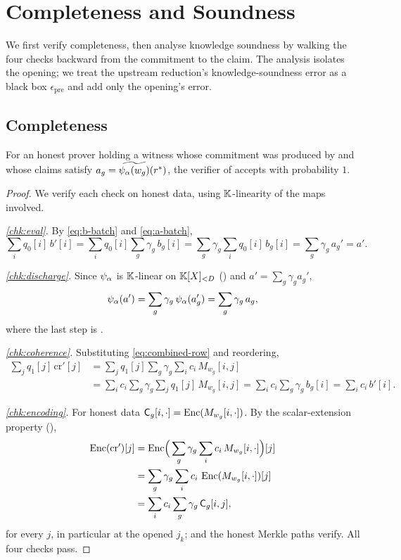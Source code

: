 \section{Completeness and Soundness}
\label{sec:soundness}

We first verify completeness, then analyse knowledge soundness by
walking the four checks backward from the commitment to the claim. The
analysis isolates the opening; we treat the upstream reduction's
knowledge-soundness error as a black box $\epsilon_{\mathrm{pre}}$ and
add only the opening's error.

\subsection{Completeness}

\begin{theorem}[Completeness]
\label{thm:completeness}
For an honest prover holding a witness whose commitment was produced by
 and whose claims satisfy
$a_g = \widetilde{\psi_{\alpha}(w_g)}(r^*)$, the verifier of  accepts
with probability $1$.
\end{theorem}

\begin{proof}
We verify each check on honest data, using $\mathbb{K}$-linearity of the maps
involved.

\emph{\ref{chk:eval}.} By \eqref{eq:b-batch} and \eqref{eq:a-batch},
\[
  \sum_i q_0[i]\,b'[i]
  = \sum_i q_0[i]\sum_g \gamma_g\,b_g[i]
  = \sum_g \gamma_g \sum_i q_0[i]\,b_g[i]
  = \sum_g \gamma_g\,a_g' = a'.
\]

\emph{\ref{chk:discharge}.} Since $\psi_{\alpha}$ is $\mathbb{K}$-linear on $\mathbb{K}[X]_{<D}$
() and $a' = \sum_g \gamma_g a_g'$,
\[
  \psi_{\alpha}(a') = \sum_g \gamma_g\,\psi_{\alpha}(a_g') = \sum_g \gamma_g\,a_g,
\]
where the last step is .

\emph{\ref{chk:coherence}.} Substituting \eqref{eq:combined-row} and reordering,
\[
\begin{aligned}
  \sum_j q_1[j]\,\mathrm{cr}'[j]
  &= \sum_j q_1[j]\sum_g \gamma_g \sum_i c_i\,M_{w_g}[i,j] \\
  &= \sum_i c_i \sum_g \gamma_g \sum_j q_1[j]\,M_{w_g}[i,j]
   = \sum_i c_i \sum_g \gamma_g\,b_g[i]
   = \sum_i c_i\,b'[i].
\end{aligned}
\]

\emph{\ref{chk:encoding}.} For honest data $\mathsf{C}_g[i,\cdot] = \operatorname{Enc}(M_{w_g}[i,\cdot])$.
By the scalar-extension property (),
\[
\begin{aligned}
  \operatorname{Enc}(\mathrm{cr}')[j]
  &= \operatorname{Enc}\!\Big(\sum_g \gamma_g \sum_i c_i\,M_{w_g}[i,\cdot]\Big)[j] \\
  &= \sum_g \gamma_g \sum_i c_i\,\operatorname{Enc}(M_{w_g}[i,\cdot])[j] \\
  &= \sum_i c_i \sum_g \gamma_g\,\mathsf{C}_g[i,j],
\end{aligned}
\]
for every $j$, in particular at the opened $j_k$; and the honest Merkle
paths verify. All four checks pass.
\end{proof}

